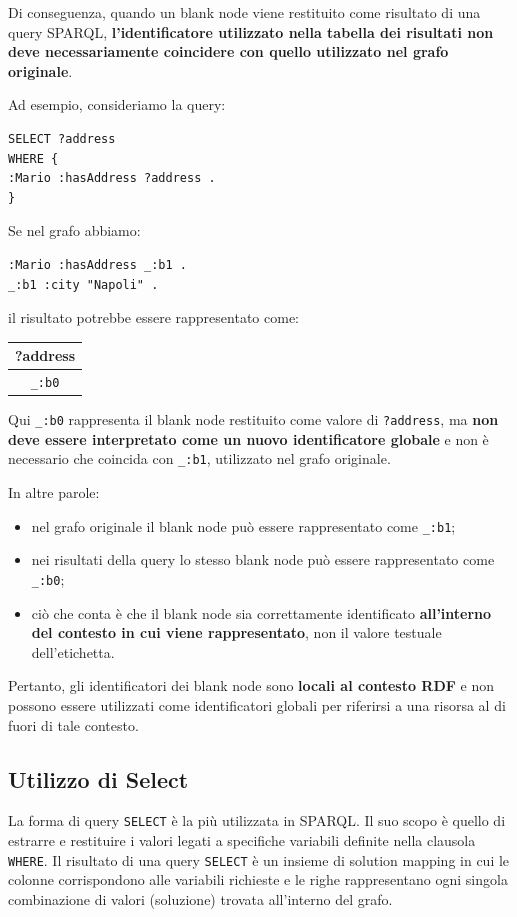 Di conseguenza, quando un blank node viene restituito come risultato di una query SPARQL, \textbf{l'identificatore utilizzato nella tabella dei risultati non deve necessariamente coincidere con quello utilizzato nel grafo originale}.

Ad esempio, consideriamo la query:

\begin{lstlisting}
SELECT ?address
WHERE {
:Mario :hasAddress ?address .
}
\end{lstlisting}

Se nel grafo abbiamo:

\begin{lstlisting}
:Mario :hasAddress _:b1 .
_:b1 :city "Napoli" .
\end{lstlisting}

il risultato potrebbe essere rappresentato come:

\begin{center}
\begin{tabular}{|c|}
\hline
\textbf{?address} \\ \hline
\texttt{\_:b0} \\ \hline
\end{tabular}
\end{center}

Qui \texttt{\_:b0} rappresenta il blank node restituito come valore di \texttt{?address}, ma \textbf{non deve essere interpretato come un nuovo identificatore globale} e non è necessario che coincida con \texttt{\_:b1}, utilizzato nel grafo originale.

In altre parole:

\begin{itemize}
\item nel grafo originale il blank node può essere rappresentato come \texttt{\_:b1};
\item nei risultati della query lo stesso blank node può essere rappresentato come \texttt{\_:b0};
\item ciò che conta è che il blank node sia correttamente identificato \textbf{all'interno del contesto in cui viene rappresentato}, non il valore testuale dell'etichetta.
\end{itemize}

Pertanto, gli identificatori dei blank node sono \textbf{locali al contesto RDF} e non possono essere utilizzati come identificatori globali per riferirsi a una risorsa al di fuori di tale contesto.

\subsection{Utilizzo di Select}
La forma di query \texttt{SELECT} è la più utilizzata in SPARQL. Il suo scopo è quello di estrarre e restituire i valori legati a specifiche variabili definite nella clausola \texttt{WHERE}. Il risultato di una query \texttt{SELECT} è un insieme di solution mapping in cui le colonne corrispondono alle variabili richieste e le righe rappresentano ogni singola combinazione di valori (soluzione) trovata all'interno del grafo.

